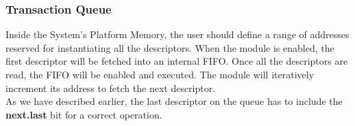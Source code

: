\subsubsection{Transaction Queue}
Inside the System's Platform Memory, the user should define a range of addresses reserved for instantiating all the descriptors. When the module is enabled, the first descriptor will be fetched into an internal FIFO. Once all the descriptors are read, the FIFO will be enabled and executed. The module will iteratively increment its address to fetch the next descriptor.\\
As we have described earlier, the last descriptor on the queue has to include the \textbf{next.last} bit for a correct operation.\\
